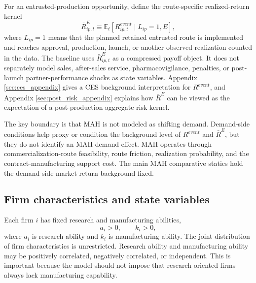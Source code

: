 \documentclass[12pt]{article}
\newcommand{\E}{\mathbb{E}}
\newcommand{\1}{\mathbf{1}}
\begin{document}
For an entrusted-production opportunity, define the route-specific realized-return kernel
\begin{equation}
    \bar R^E_{ip,t}
    \equiv
    \E_t\!\left[R^{event}_{ip,t}\mid L_{ip}=1,E\right],
    \label{eq:RbarE}
\end{equation}
where $L_{ip}=1$ means that the planned retained entrusted route is implemented and reaches approval, production, launch, or another observed realization counted in the data. The baseline uses $\bar R^E_{ip,t}$ as a compressed payoff object. It does not separately model sales, after-sales service, pharmacovigilance, penalties, or post-launch partner-performance shocks as state variables. Appendix \ref{sec:ces_appendix} gives a CES background interpretation for $R^{event}$, and Appendix \ref{sec:post_risk_appendix} explains how $\bar R^E$ can be viewed as the expectation of a post-production aggregate risk kernel.

The key boundary is that MAH is not modeled as shifting demand. Demand-side conditions help proxy or condition the background level of $R^{event}$ and $\bar R^E$, but they do not identify an MAH demand effect. MAH operates through commercialization-route feasibility, route friction, realization probability, and the contract-manufacturing support cost. The main MAH comparative statics hold the demand-side market-return background fixed.

\subsection{Firm characteristics and state variables}

Each firm $i$ has fixed research and manufacturing abilities,
\begin{equation}
    a_i>0,\qquad k_i>0,
    \label{eq:jointdist}
\end{equation}
where $a_i$ is research ability and $k_i$ is manufacturing ability. The joint distribution of firm characteristics is unrestricted. Research ability and manufacturing ability may be positively correlated, negatively correlated, or independent. This is important because the model should not impose that research-oriented firms always lack manufacturing capability.
\end{document}
